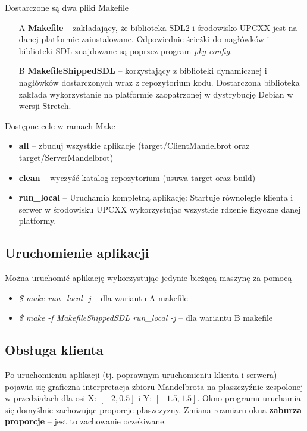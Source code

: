 Dostarczone są dwa pliki Makefile
\begin{itemize}
    \item [A] \textbf{Makefile} -- zakładający, że biblioteka SDL2 i środowisko
    UPCXX jest na danej platformie zainstalowane. Odpowiednie ścieżki do
    nagłówków i biblioteki SDL znajdowane są poprzez program
    \textit{pkg-config}.
    \item [B] \textbf{MakefileShippedSDL} -- korzystający z biblioteki
    dynamicznej i nagłówków dostarczonych wraz z repozytorium kodu. Dostarczona
    biblioteka zakłada wykorzystanie na platformie zaopatrzonej w dystrybucję
    Debian w wersji Stretch.
\end{itemize}

Dostępne cele w ramach Make
\begin{itemize}
    \item \textbf{all} -- zbuduj wszystkie aplikacje (target/ClientMandelbrot
    oraz target/ServerMandelbrot)
    \item \textbf{clean} -- wyczyść katalog repozytorium (usuwa target oraz build)
    \item \textbf{run\_local} -- Uruchamia kompletną aplikację: Startuje
    równolegle klienta i serwer w środowisku UPCXX wykorzystując wszystkie
    rdzenie fizyczne danej platformy.
\end{itemize}

\subsection{Uruchomienie aplikacji}
Można uruchomić aplikację wykorzystując jedynie bieżącą maszynę za pomocą
\begin{itemize}
    \item \textit{\$ make run\_local -j} -- dla wariantu A makefile
    \item \textit{\$ make -f MakefileShippedSDL run\_local -j} -- dla wariantu B makefile
\end{itemize}

\subsection{Obsługa klienta}
Po uruchomieniu aplikacji (tj. poprawnym uruchomieniu klienta i serwera) pojawia
się graficzna interpretacja zbioru Mandelbrota na płaszczyźnie zespolonej w
przedziałach dla osi X: $[-2, 0.5]$ i Y: $[-1.5, 1.5]$. Okno programu uruchamia
się domyślnie zachowując proporcje płaszczyzny. Zmiana rozmiaru okna
\textbf{zaburza proporcje} -- jest to zachowanie oczekiwane.

